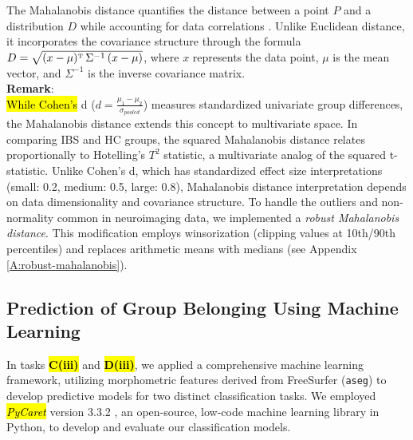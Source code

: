 \documentclass[diagnostics,article,accept,pdftex,moreauthors]{Definitions/mdpi}
\begin{document}
The Mahalanobis distance \cite{mahalanobis1936} quantifies the distance between a point $P$ and a distribution $D$ while accounting for data correlations \cite{de2000mahalanobis}. Unlike Euclidean distance, it incorporates the covariance structure through the formula $D = \sqrt{(x - \mu)^{\text{\tiny T}} \, \Sigma^{-1} \, (x - \mu)}$, where $x$ represents the data point, $\mu$ is the mean vector, and $\Sigma^{-1}$ is the inverse covariance matrix.\\


\noindent \textbf{Remark}:\\
\hl{While Cohen's} d ($d = \frac{\mu_1 - \mu_2}{\sigma_{pooled}}$) measures standardized univariate group differences, the Mahalanobis distance extends this concept to multivariate space. In comparing IBS and HC groups, the squared Mahalanobis distance relates proportionally to Hotelling's $T^2$ statistic, a multivariate analog of the squared t-statistic. Unlike Cohen's d, which has standardized effect size interpretations (small: 0.2, medium: 0.5, large: 0.8), Mahalanobis distance interpretation depends on data dimensionality and covariance structure. To handle the outliers and non-normality common in neuroimaging data, we implemented a \textit{robust Mahalanobis distance}. This modification employs winsorization (clipping values at 10th/90th percentiles) and replaces arithmetic means with medians (see Appendix \ref{A:robust-mahalanobis}).

\subsection{Prediction of Group Belonging Using Machine Learning}

In tasks \textbf{\hl{C(iii)}%
} and \textbf{\hl{D(iii)}}, we applied a comprehensive machine learning framework, utilizing morphometric features derived from FreeSurfer (\texttt{aseg}) to develop predictive models for two distinct classification tasks.  We employed \textit{\hl{PyCaret}} %
version 3.3.2 %
 , an open-source, low-code machine learning library in Python, to develop and evaluate our classification models.
\end{document}
